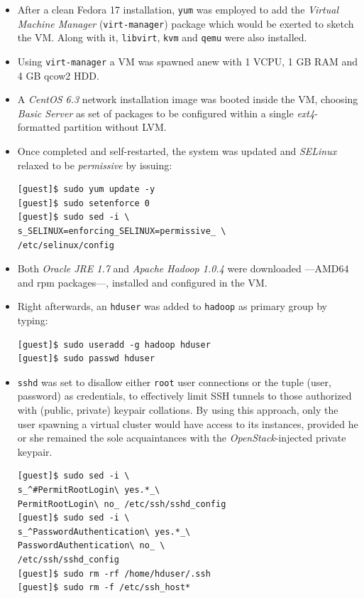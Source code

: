 \documentclass{sig-alternate}
\begin{document}
\begin{itemize}
 \item After a clean Fedora 17 installation, \texttt{yum} was employed to add the \emph{Virtual Machine Manager} (\texttt{virt-manager}) package which would be exerted to sketch the VM. Along with it, \texttt{libvirt}, \texttt{kvm} and \texttt{qemu} were also installed.
 
 \item Using \texttt{virt-manager} a VM was spawned anew with 1 VCPU, 1 GB RAM and 4 GB qcow2 HDD.
 
 \item A \emph{CentOS 6.3} network installation image was booted inside the VM, choosing \emph{Basic Server} as set of packages to be configured within a single \emph{ext4}-formatted partition without LVM.
 
 \item Once completed and self-restarted, the system was updated and \emph{SELinux} relaxed to be \emph{permissive} by issuing:
 
 \begin{verbatim}
[guest]$ sudo yum update -y
[guest]$ sudo setenforce 0
[guest]$ sudo sed -i \
s_SELINUX=enforcing_SELINUX=permissive_ \
/etc/selinux/config
 \end{verbatim}
 
 \item Both \emph{Oracle JRE 1.7} and \emph{Apache Hadoop 1.0.4} were downloaded ---AMD64 and rpm packages---, installed and configured in the VM.
 
 \item Right afterwards, an \texttt{hduser} was added to \texttt{hadoop} as primary group by typing:
 
 \begin{verbatim}
[guest]$ sudo useradd -g hadoop hduser
[guest]$ sudo passwd hduser
 \end{verbatim}

 \item \texttt{sshd} was set to disallow either \texttt{root} user connections or the tuple (user, password) as credentials, to effectively limit SSH tunnels to those authorized with (public, private) keypair collations. By using this approach, only the user spawning a virtual cluster would have access to its instances, provided he or she remained the sole acquaintances with the \emph{OpenStack}-injected private keypair.
 
   \begin{verbatim}
[guest]$ sudo sed -i \
s_^#PermitRootLogin\ yes.*_\
PermitRootLogin\ no_ /etc/ssh/sshd_config
[guest]$ sudo sed -i \
s_^PasswordAuthentication\ yes.*_\
PasswordAuthentication\ no_ \
/etc/ssh/sshd_config
[guest]$ sudo rm -rf /home/hduser/.ssh
[guest]$ sudo rm -f /etc/ssh_host*
   \end{verbatim}
   

\end{itemize}
\end{document}
